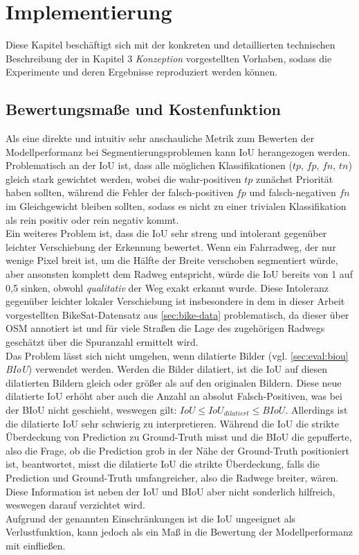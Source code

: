\chapter{Implementierung} 

Diese Kapitel beschäftigt sich mit der konkreten und detaillierten technischen Beschreibung 
der in Kapitel 3 \textit{Konzeption} vorgestellten Vorhaben, sodass die Experimente und deren Ergebnisse 
reproduziert werden können.


\section{Bewertungsmaße und Kostenfunktion} \label{sec:eval}


Als eine direkte und intuitiv sehr anschauliche Metrik zum Bewerten der Modellperformanz bei Segmentierungsproblemen
kann \ac{IoU} herangezogen werden. \\ 
Problematisch an der \ac{IoU} ist, dass alle möglichen Klassifikationen ($tp$, $fp$, $fn$, $tn$)
gleich stark gewichtet werden, wobei die wahr-positiven $tp$ zunächst Priorität haben sollten, 
während die Fehler der falsch-positiven $fp$ und falsch-negativen $fn$ im Gleichgewicht bleiben sollten, 
sodass es nicht zu einer trivialen Klassifikation als rein positiv oder rein negativ kommt. \\
Ein weiteres Problem ist, dass die \ac{IoU} sehr streng und intolerant gegenüber leichter Verschiebung der Erkennung 
bewertet. Wenn ein Fahrradweg, der nur wenige Pixel breit ist, um die Hälfte der Breite verschoben segmentiert würde, 
aber ansonsten komplett dem Radweg entspricht, würde die \ac{IoU} bereits von 1 auf 0,5 sinken, obwohl \textit{qualitativ} 
der Weg exakt erkannt wurde. Diese Intoleranz gegenüber leichter lokaler Verschiebung ist insbesondere in dem 
in dieser Arbeit vorgestellten BikeSat-Datensatz aus \autoref{sec:bike-data} problematisch, 
da dieser über \ac{OSM} annotiert ist und für viele Straßen die Lage des zugehörigen Radwegs geschätzt über 
die Spuranzahl ermittelt wird. \\
Das Problem lässt sich nicht umgehen, wenn dilatierte Bilder (vgl. \autoref{sec:eval:biou} \textit{BIoU}) verwendet werden.
Werden die Bilder dilatiert, ist die IoU auf diesen dilatierten Bildern gleich oder größer als auf den originalen Bildern. 
Diese neue dilatierte IoU erhöht aber auch die Anzahl an absolut Falsch-Positiven, was bei der BIoU nicht geschieht, 
weswegen gilt: $IoU \leq IoU_{dilatiert} \leq BIoU$. Allerdings ist die dilatierte IoU sehr schwierig zu interpretieren.
Während die IoU die strikte Überdeckung von Prediction zu Ground-Truth misst und die BIoU die gepufferte, also 
die Frage, ob die Prediction grob in der Nähe der Ground-Truth positioniert ist, beantwortet, misst die dilatierte IoU die strikte 
Überdeckung, falls die Prediction und Ground-Truth umfangreicher, also die Radwege breiter, wären. 
Diese Information ist neben der IoU und BIoU aber nicht sonderlich hilfreich, weswegen darauf verzichtet wird. \\ 
Aufgrund der genannten Einschränkungen ist die \ac{IoU} ungeeignet als Verlustfunktion, kann jedoch als ein Maß 
in die Bewertung der Modellperformanz mit einfließen. 

